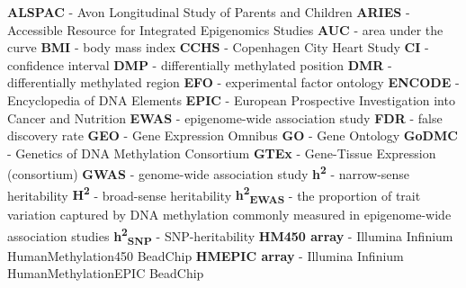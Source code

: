 \documentclass[11pt,twoside]{bristolthesis}
\begin{document}
  \begin{abbreviations}
    \textbf{ALSPAC} - Avon Longitudinal Study of Parents and Children \newline
    \textbf{ARIES} - Accessible Resource for Integrated Epigenomics Studies \newline
    \textbf{AUC} - area under the curve \newline
    \textbf{BMI} - body mass index \newline
    \textbf{CCHS} - Copenhagen City Heart Study \newline
    \textbf{CI} - confidence interval \newline
    \textbf{DMP} - differentially methylated position \newline
    \textbf{DMR} - differentially methylated region \newline
    \textbf{EFO} - experimental factor ontology \newline
    \textbf{ENCODE} - Encyclopedia of DNA Elements \newline
    \textbf{EPIC} - European Prospective Investigation into Cancer and Nutrition \newline
    \textbf{EWAS} - epigenome-wide association study \newline
    \textbf{FDR} - false discovery rate \newline
    \textbf{GEO} - Gene Expression Omnibus \newline
    \textbf{GO} - Gene Ontology \newline
    \textbf{GoDMC} - Genetics of DNA Methylation Consortium \newline
    \textbf{GTEx} - Gene-Tissue Expression (consortium) \newline
    \textbf{GWAS} - genome-wide association study \newline
    \textbf{h\textsuperscript{2}} - narrow-sense heritability \newline
    \textbf{H\textsuperscript{2}} - broad-sense heritability \newline
    \textbf{h\textsuperscript{2}\textsubscript{EWAS}} - the proportion of trait variation captured by DNA methylation commonly measured in epigenome-wide association studies \newline
    \textbf{h\textsuperscript{2}\textsubscript{SNP}} - SNP-heritability \newline
    \textbf{HM450 array} - Illumina Infinium HumanMethylation450 BeadChip \newline
    \textbf{HMEPIC array} - Illumina Infinium HumanMethylationEPIC BeadChip \newline

\end{abbreviations}
\end{document}
